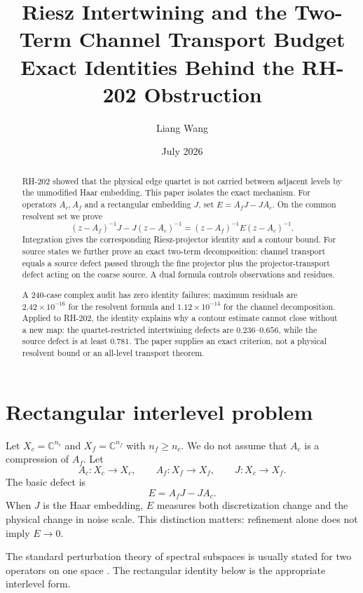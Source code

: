\documentclass[12pt]{article}
\title{Riesz Intertwining and the Two-Term Channel Transport Budget\\
\large Exact Identities Behind the RH-202 Obstruction}
\author{Liang Wang}
\date{July 2026}
\theoremstyle{remark}\newtheorem{remark}[theorem]{Remark}
\newcommand{\C}{\mathbb C}
\begin{document}
\maketitle

\begin{abstract}
RH-202 showed that the physical edge quartet is not carried between adjacent
levels by the unmodified Haar embedding.  This paper isolates the exact
mechanism.  For operators $A_c,A_f$ and a rectangular embedding $J$, set
$E=A_fJ-JA_c$.  On the common resolvent set we prove
\[
 (z-A_f)^{-1}J-J(z-A_c)^{-1}
 =(z-A_f)^{-1}E(z-A_c)^{-1}.
\]
Integration gives the corresponding Riesz-projector identity and a contour
bound.  For source states we further prove an exact two-term decomposition:
channel transport equals a source defect passed through the fine projector
plus the projector-transport defect acting on the coarse source.  A dual
formula controls observations and residues.

A 240-case complex audit has zero identity failures; maximum residuals are
$2.42\times10^{-16}$ for the resolvent formula and
$1.12\times10^{-14}$ for the channel decomposition.  Applied to RH-202, the
identity explains why a contour estimate cannot close without a new map:
the quartet-restricted intertwining defects are $0.236$--$0.656$, while the
source defect is at least $0.781$.  The paper supplies an exact criterion,
not a physical resolvent bound or an all-level transport theorem.
\end{abstract}

\section{Rectangular interlevel problem}

Let $X_c=\C^{n_c}$ and $X_f=\C^{n_f}$ with $n_f\ge n_c$.  We do not assume
that $A_c$ is a compression of $A_f$.  Let
\begin{equation}\label{eq:data}
 A_c:X_c\to X_c,\qquad A_f:X_f\to X_f,
 \qquad J:X_c\to X_f.
\end{equation}
The basic defect is
\begin{equation}\label{eq:E}
 E=A_fJ-JA_c.
\end{equation}
When $J$ is the Haar embedding, $E$ measures both discretization change and
the physical change in noise scale.  This distinction matters: refinement
alone does not imply $E\to0$.

The standard perturbation theory of spectral subspaces is usually stated
for two operators on one space \citep{Kato1995,StewartSun1990}.  The
rectangular identity below is the appropriate interlevel form.
\end{document}
